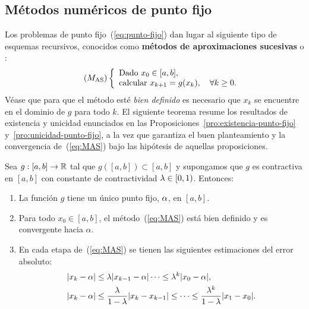 \subsection*{Métodos numéricos de punto fijo}

Los problemas de punto fijo~(\ref{eq:punto-fijo}) dan lugar al
siguiente tipo de esquemas recursivos, conocidos como \textbf{métodos
  de aproximaciones sucesivas} o :
\begin{equation}
  \tag{$M_{\text{AS}}$}
  \left\{
    \begin{array}{l}
      \text{Dado } x_0\in [a,b], \\
      \text{calcular } x_{k+1}=g(x_k), \quad \forall k\ge 0.
    \end{array}
  \right.
  \label{eq:MAS}
\end{equation}
Véase que para que el método esté \textit{bien definido} es necesario
que $x_k$ se encuentre en el dominio de $g$ para todo $k$.
El siguiente teorema resume los resultados de existencia y unicidad
enunciados en las Proposiciones~\ref{pro:existencia-punto-fijo}
y~\ref{pro:unicidad-punto-fijo}, a la vez que garantiza el buen
planteamiento y la convergencia de~(\ref{eq:MAS}) bajo las hipótesis
de aquellas proposiciones.

\begin{theorem}
  \label{thm:punto-fijo-Banach}
  Sea $g:[a,b]\to\operatorname{{\mathbb R}}$ tal que $g([a,b]) \subset [a,b]$ y supongamos
  que $g$ es contractiva en $[a,b]$ con constante de contractividad
  $\lambda\in [0,1)$. Entonces:
  \begin{enumerate}
  \item
    \label{item:punto-fijo-Banach:1}
    La función $g$ tiene un \textsf{único punto fijo}, $\alpha$, en
    $[a,b]$.
  \item
    \label{item:punto-fijo-Banach:2}
    Para todo $x_0\in [a,b]$, el método~(\ref{eq:MAS}) está bien
    definido y es \textsf{convergente} hacia $\alpha$.
  \item En cada etapa de~(\ref{eq:MAS}) se tienen las siguientes
    \textsf{estimaciones} del error absoluto:
    \label{item:punto-fijo-Banach:3}
    \begin{align}
      \label{eq:pto-fijo:cota-a-priori}
      |x_k-\alpha| &\le \lambda |x_{k-1}-\alpha| \cdots \le \lambda^k |x_0-\alpha|,
      \\
      \label{eq:pto-fijo:cota-a-posteriori}
      |x_k-\alpha| &\le \frac{\lambda}{1-\lambda}
                    |x_k-x_{k-1}| \le \dots \le
                    \frac{\lambda^k}{1-\lambda}
                    |x_1-x_0|.
    \end{align}
  \end{enumerate}
\end{theorem}

